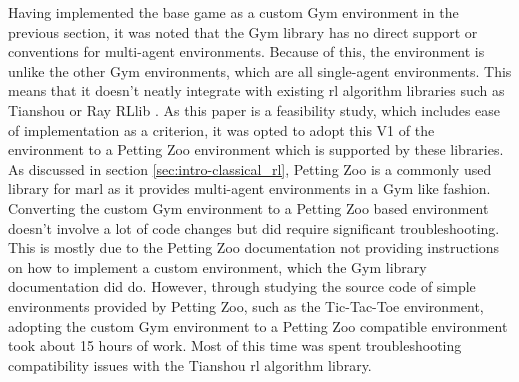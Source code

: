 Having implemented the base game as a custom Gym environment in the previous section, it was noted that the Gym library has no direct support or conventions for multi-agent environments.
Because of this, the environment is unlike the other Gym environments, which are all single-agent environments.
This means that it doesn't neatly integrate with existing \gls{rl} algorithm libraries such as Tianshou \citep{tianshou} or Ray RLlib \citep{rllib}.
As this paper is a feasibility study, which includes ease of implementation as a criterion, it was opted to adopt this V1 of the environment to a Petting Zoo environment which is supported by these libraries.
As discussed in section \ref{sec:intro-classical_rl}, Petting Zoo is a commonly used library for \gls{marl} as it provides multi-agent environments in a Gym like fashion.
Converting the custom Gym environment to a Petting Zoo based environment doesn't involve a lot of code changes but did require significant troubleshooting.
This is mostly due to the Petting Zoo documentation not providing instructions on how to implement a custom environment, which the Gym library documentation did do.
However, through studying the source code of simple environments provided by Petting Zoo, such as the Tic-Tac-Toe environment, adopting the custom Gym environment to a Petting Zoo compatible environment took about 15 hours of work.
Most of this time was spent troubleshooting compatibility issues with the Tianshou \gls{rl} algorithm library.

